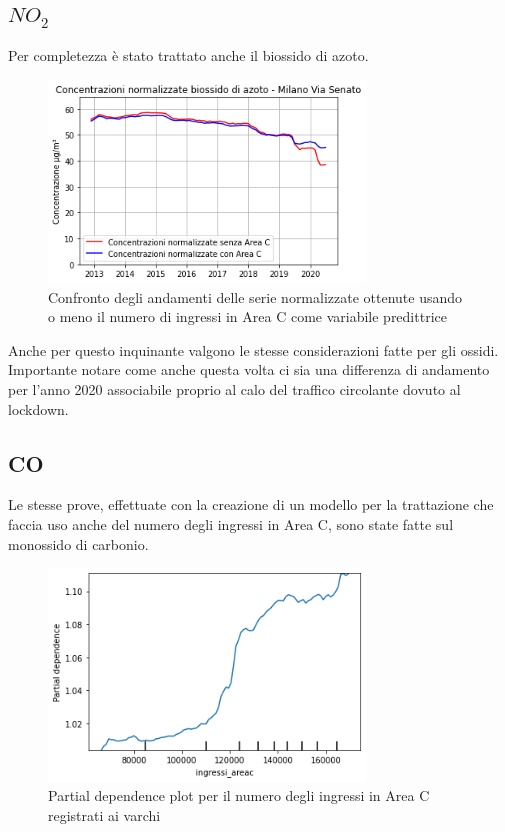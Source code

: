 \documentclass[a4paper]{report}
\begin{document}
\subsection{$NO_2$}
Per completezza è stato trattato anche il biossido di azoto.

\begin{figure}[h]
\centering
\includegraphics[width=0.75\textwidth]{no2_areac}
\caption{Confronto degli andamenti delle serie normalizzate ottenute usando o meno il numero di ingressi in Area C come variabile predittrice}
\label{fig:no2_areac}
\end{figure}

Anche per questo inquinante valgono le stesse considerazioni fatte per gli ossidi. Importante notare come anche questa volta ci sia una differenza di andamento per l'anno 2020 associabile proprio al calo del traffico circolante dovuto al lockdown.

\subsection{CO}
Le stesse prove, effettuate con la creazione di un modello per la trattazione che faccia uso anche del numero degli ingressi in Area C, sono state fatte sul monossido di carbonio.

\begin{figure}[h]
\centering
\includegraphics[width=0.75\textwidth]{co_part_dep}
\caption{Partial dependence plot per il numero degli ingressi in Area C registrati ai varchi}
\label{fig:co_part_dep}
\end{figure}
\end{document}
